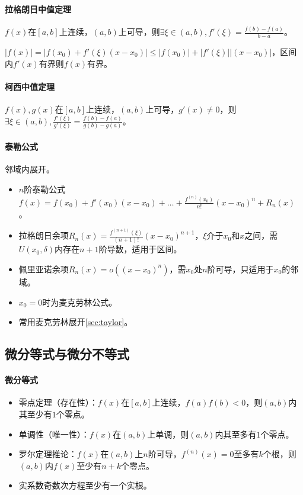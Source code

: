 \documentclass[
12pt, %
a4paper, 
oneside, %
headinclude,footinclude, %
]{scrartcl}
\begin{document}
\paragraph{拉格朗日中值定理}
$ f(x) $在$ [a, b] $上连续，$ (a, b) $上可导，则$ \exists \xi \in (a, b), f'(\xi) = \frac{f(b) - f(a)}{b - a} $。

$ |f(x)| = |f(x_0) + f'(\xi)(x - x_0)| \leq |f(x_0)| + |f'(\xi)||(x - x_0)| $，区间内$ f'(x) $有界则$ f(x) $有界。
\paragraph{柯西中值定理}
$ f(x),g(x) $在$ [a, b] $上连续，$ (a, b) $上可导，$ g'(x) \neq 0 $，则$ \exists \xi \in (a, b), \frac{f'(\xi)}{g'(\xi)} = \frac{f(b) - f(a)}{g(b) - g(a)} $。
\paragraph{泰勒公式}
邻域内展开。
\begin{itemize}
\item $ n $阶泰勒公式$ f(x) = f(x_0) + f'(x_0)(x - x_0) + \dots + \frac{f^{(n)}(x_0)}{n!}(x - x_0)^n + R_n(x) $。
\item 拉格朗日余项$ R_n(x) = \frac{f^{(n + 1)}(\xi)}{(n + 1)!}(x - x_0)^{n + 1} $，$ \xi $介于$ x_0 $和$ x $之间，需$ U(x_0, \delta) $内存在$ n + 1 $阶导数，适用于区间。
\item 佩里亚诺余项$ R_n(x) = o((x-x_0)^n) $，需$ x_0 $处$ n $阶可导，只适用于$ x_0 $的邻域。
\item $ x_0 = 0 $时为麦克劳林公式。
\item 常用麦克劳林展开\ref{sec:taylor}。
\end{itemize}
\subsection{微分等式与微分不等式}
\paragraph{微分等式}
\begin{itemize}
\item 零点定理（存在性）：$ f(x) $在$ [a, b] $上连续，$ f(a)f(b) < 0 $，则$ (a, b) $内其至少有$ 1 $个零点。
\item 单调性（唯一性）：$ f(x) $在$ (a, b) $上单调，则$ (a, b) $内其至多有$ 1 $个零点。
\item 罗尔定理推论：$ f(x) $在$ (a, b) $上$ n $阶可导，$ f^{(n)}(x) = 0 $至多有$ k $个根，则$ (a, b) $内$ f(x) $至少有$ n + k $个零点。
\item 实系数奇数次方程至少有一个实根。
\end{itemize}
\end{document}
